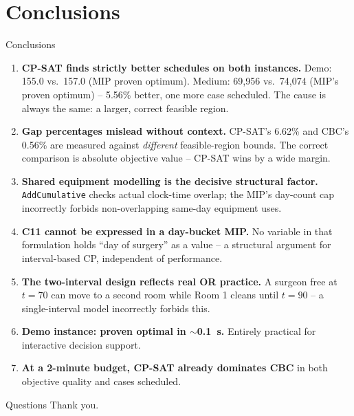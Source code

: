 \documentclass[10pt,aspectratio=169]{beamer}
\begin{document}
\section{Conclusions}

\begin{frame}{Conclusions}
  \begin{enumerate}\small
    \item \textbf{CP-SAT finds strictly better schedules on both instances.}
      Demo: 155.0 vs.\ 157.0 (MIP proven optimum). Medium: 69{,}956 vs.\
      74{,}074 (MIP's proven optimum) -- 5.56\% better, one more case
      scheduled. The cause is always the same: a larger, correct feasible
      region.
    \item \textbf{Gap percentages mislead without context.} CP-SAT's 6.62\%
      and CBC's 0.56\% are measured against \emph{different} feasible-region
      bounds. The correct comparison is absolute objective value -- CP-SAT
      wins by a wide margin.
    \item \textbf{Shared equipment modelling is the decisive structural factor.}
      \texttt{AddCumulative} checks actual clock-time overlap; the MIP's
      day-count cap incorrectly forbids non-overlapping same-day equipment
      uses.
    \item \textbf{C11 cannot be expressed in a day-bucket MIP.} No variable
      in that formulation holds ``day of surgery'' as a value -- a structural
      argument for interval-based CP, independent of performance.
    \item \textbf{The two-interval design reflects real OR practice.}
      A surgeon free at $t=70$ can move to a second room while Room 1 cleans
      until $t=90$ -- a single-interval model incorrectly forbids this.
    \item \textbf{Demo instance: proven optimal in $\sim$0.1~s.}
      Entirely practical for interactive decision support.
    \item \textbf{At a 2-minute budget, CP-SAT already dominates CBC} in
      both objective quality and cases scheduled.
  \end{enumerate}
\end{frame}

\begin{frame}{Questions}
  \centering\Large Thank you.
  \vspace{1em}
  \normalsize
  \hyperlink{toc}{}
  \quad
  \hyperlink{mip1}{}
\end{frame}
\end{document}
